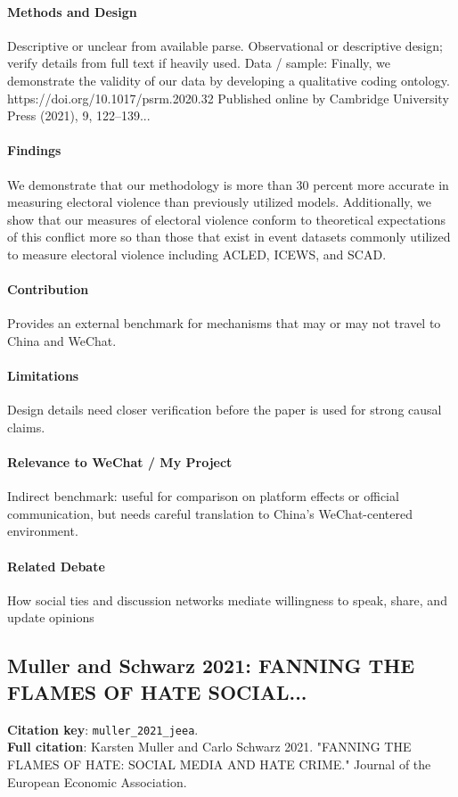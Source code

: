 \documentclass[12pt]{article}
\begin{document}
\paragraph{Methods and Design} Descriptive or unclear from available parse. Observational or descriptive design; verify details from full text if heavily used. Data / sample: Finally, we demonstrate the validity of our data by developing a qualitative coding ontology. https://doi.org/10.1017/psrm.2020.32 Published online by Cambridge University Press (2021), 9, 122--139...

\paragraph{Findings} We demonstrate that our methodology is more than 30 percent more accurate in measuring electoral violence than previously utilized models. Additionally, we show that our measures of electoral violence conform to theoretical expectations of this conflict more so than those that exist in event datasets commonly utilized to measure electoral violence including ACLED, ICEWS, and SCAD.

\paragraph{Contribution} Provides an external benchmark for mechanisms that may or may not travel to China and WeChat.

\paragraph{Limitations} Design details need closer verification before the paper is used for strong causal claims.

\paragraph{Relevance to WeChat / My Project} Indirect benchmark: useful for comparison on platform effects or official communication, but needs careful translation to China's WeChat-centered environment.

\paragraph{Related Debate} How social ties and discussion networks mediate willingness to speak, share, and update opinions


\subsection{Muller and Schwarz 2021: FANNING THE FLAMES OF HATE SOCIAL...}
\textbf{Citation key}: \texttt{muller\_2021\_jeea}.\\
\textbf{Full citation}: Karsten Muller and Carlo Schwarz 2021. "FANNING THE FLAMES OF HATE: SOCIAL MEDIA AND HATE CRIME." Journal of the European Economic Association.
\end{document}
